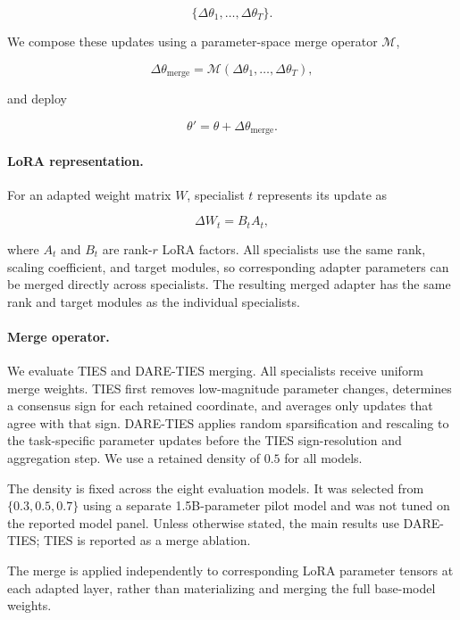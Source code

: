 \[
\{\Delta\theta_1,\ldots,\Delta\theta_T\}.
\]

We compose these updates using a parameter-space merge operator
$\mathcal{M}$,

\[
\Delta\theta_{\mathrm{merge}}
=
\mathcal{M}
\left(
\Delta\theta_1,\ldots,\Delta\theta_T
\right),
\]

and deploy

\[
\theta'
=
\theta + \Delta\theta_{\mathrm{merge}}.
\]

\paragraph{LoRA representation.}
For an adapted weight matrix $W$, specialist $t$ represents its update as

\[
\Delta W_t = B_t A_t,
\]

where $A_t$ and $B_t$ are rank-$r$ LoRA factors. All specialists use the
same rank, scaling coefficient, and target modules, so corresponding adapter
parameters can be merged directly across specialists. The resulting merged
adapter has the same rank and target modules as the individual specialists.

\paragraph{Merge operator.}
We evaluate TIES and DARE-TIES merging. All specialists receive uniform merge
weights. TIES first removes low-magnitude parameter changes, determines a
consensus sign for each retained coordinate, and averages only updates that
agree with that sign. DARE-TIES applies random sparsification and rescaling to
the task-specific parameter updates before the TIES sign-resolution and
aggregation step. We use a retained density of $0.5$ for all models.

The density is fixed across the eight evaluation models. It was selected from
$\{0.3,0.5,0.7\}$ using a separate 1.5B-parameter pilot model and was not tuned
on the reported model panel. Unless otherwise stated, the main results use
DARE-TIES; TIES is reported as a merge ablation.

The merge is applied independently to corresponding LoRA parameter tensors at
each adapted layer, rather than materializing and merging the full base-model
weights.


